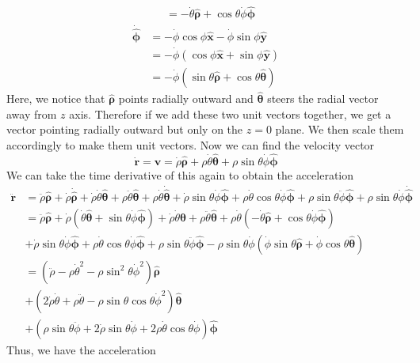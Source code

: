 \documentclass[12pt]{article}
\newcommand{\paren}[1]{\left( #1 \right)}
\newcommand{\unx}{\hat{\mathbf{x}}}
\newcommand{\uny}{\hat{\mathbf{y}}}
\newcommand{\untheta}{\hat{\boldsymbol\theta}}
\newcommand{\unphi}{\hat{\boldsymbol\phi}}
\newcommand{\unrho}{\hat{\boldsymbol\rho}}
\begin{document}
\begin{enumerate}
\begin{align*}
                       &= -\dot{\theta}\unrho + \cos\theta\dot{\phi}\unphi
    \end{align*}
    \begin{align*}
        \dot{\unphi} &= -\dot\phi\cos\phi \unx - \dot\phi\sin\phi \uny\\
                    &= -\dot\phi\paren{\cos\phi \unx + \sin\phi \uny}\\
                    &= -\dot\phi\paren{\sin\theta\unrho + \cos\theta\untheta}
    \end{align*}
    Here, we notice that $\unrho$ points radially outward and $\untheta$ steers the radial vector away from $z$ axis. Therefore if we add these two unit vectors together, we get a vector pointing radially outward but only on the $z=0$ plane. We then scale them accordingly to make them unit vectors. 
    Now we can find the velocity vector
    \[
    \dot{\mathbf{r}} = \mathbf{v} = \dot{\rho}\unrho + \rho\dot{\theta}\untheta + \rho\sin\theta\dot{\phi}\unphi
    \]
    We can take the time derivative of this again to obtain the acceleration
    \begin{align*}
        \ddot{\mathbf{r}}   &= \ddot{\rho}\unrho + \dot{\rho}\dot{\unrho} + \dot{\rho}\dot{\theta}\untheta + \rho\ddot{\theta}\untheta +\rho\dot{\theta}\dot{\untheta} + \dot{\rho}\sin\theta\dot{\phi}\unphi + \rho\dot{\theta}\cos\theta\dot{\phi}\unphi + \rho\sin\theta\ddot{\phi}\unphi +\rho\sin\theta\dot{\phi}\dot{\unphi}\\
                            &= \ddot{\rho}\unrho + \dot{\rho}\paren{\dot{\theta}\untheta + \sin\theta\dot{\phi}\unphi} + \dot{\rho}\dot{\theta}\untheta + \rho\ddot{\theta}\untheta + \rho\dot{\theta}\paren{-\dot{\theta}\unrho + \cos\theta\dot{\phi}\unphi} \\
                            &+ \dot{\rho}\sin\theta\dot{\phi}\unphi + \rho\dot{\theta}\cos\theta\dot{\phi}\unphi + \rho\sin\theta\ddot{\phi}\unphi - \rho\sin\theta\dot{\phi}\paren{\dot\phi\sin\theta\unrho + \dot\phi\cos\theta\untheta}\\
                            &=\paren{\ddot{\rho} - \rho\dot{\theta}^2-\rho\sin^2\theta\dot\phi^2}\unrho\\
                            &+\paren{2\dot\rho\dot\theta + \rho\ddot{\theta} -\rho\sin\theta\cos\theta\dot\phi^2}\untheta\\
                            &+\paren{\rho\sin\theta\ddot{\phi}+2\dot\rho\sin\theta\dot\phi + 2\rho\dot\theta\cos\theta\dot\phi} \unphi
    \end{align*}
    Thus, we have the acceleration

\end{enumerate}
\end{document}
